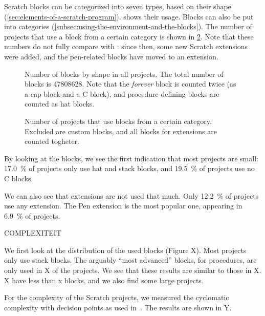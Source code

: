 \documentclass[../main]{subfiles}
\begin{document}
Scratch blocks can be categorized into seven types, based on their shape (\cref{sec:elements-of-a-scratch-program}).
 shows their usage.
Blocks can also be put into categories (\cref{subsec:using-the-environment-and-the-blocks}).
The number of projects that use a block from a certain category is shown in \cref{fig:block-categories}.
Note that these numbers do not fully compare with \textcite{aivaloglouHowKidsCode2016}: since then, some new Scratch extensions were added, and the pen-related blocks have moved to an extension.

\begin{figure}
    \centering
    
    \caption{
        Number of blocks by shape in all projects.
        The total number of blocks is \num{47808628}.
        Note that the \textit{forever} block is counted twice (as a cap block and a C block), and procedure-defining blocks are counted as hat blocks.
    }
    \label{fig:block-shapes}
\end{figure}

\begin{figure}
    \centering
    
    \caption{
        Number of projects that use blocks from a certain category.
        Excluded are custom blocks, and all blocks for extensions are counted togheter.
    }
    \label{fig:block-categories}
\end{figure}

By looking at the blocks, we see the first indication that most projects are small: \qty{17.0}{\percent} of projects only use hat and stack blocks, and \qty{19.5}{\percent} of projects use no C blocks.

We can also see that extensions are not used that much.
Only \qty{12.2}{\percent} of projects use any extension.
The Pen extension is the most popular one, appearing in \qty{6.9}{\percent} of projects.

COMPLEXITEIT


We first look at the distribution of the used blocks (Figure X).
Most projects only use stack blocks.
The arguably ``most advanced'' blocks, for procedures, are only used in X of the projects.
We see that these results are similar to those in X.
X have less than x blocks, and we also find some large projects.

For the complexity of the Scratch projects, we measured the cyclomatic complexity with decision points as used in~\cite{aivaloglouHowKidsCode2016}.
The results are shown in Y.
\end{document}
